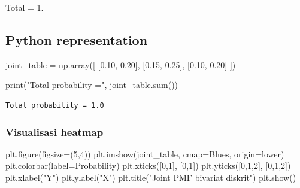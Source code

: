 \documentclass[
  letterpaper,
  DIV=11,
  numbers=noendperiod]{scrreprt}
\newenvironment{Shaded}{\begin{snugshade}}{\end{snugshade}}
\newcommand{\BuiltInTok}[1]{\textcolor[rgb]{0.00,0.23,0.31}{#1}}
\newcommand{\DecValTok}[1]{\textcolor[rgb]{0.68,0.00,0.00}{#1}}
\newcommand{\FloatTok}[1]{\textcolor[rgb]{0.68,0.00,0.00}{#1}}
\newcommand{\NormalTok}[1]{\textcolor[rgb]{0.00,0.23,0.31}{#1}}
\newcommand{\OperatorTok}[1]{\textcolor[rgb]{0.37,0.37,0.37}{#1}}
\newcommand{\StringTok}[1]{\textcolor[rgb]{0.13,0.47,0.30}{#1}}
\begin{document}
Total = 1.

\subsection{Python representation}\label{python-representation}

\begin{Shaded}
\begin{Highlighting}[]
\NormalTok{joint\_table }\OperatorTok{=}\NormalTok{ np.array([}
\NormalTok{    [}\FloatTok{0.10}\NormalTok{, }\FloatTok{0.20}\NormalTok{],}
\NormalTok{    [}\FloatTok{0.15}\NormalTok{, }\FloatTok{0.25}\NormalTok{],}
\NormalTok{    [}\FloatTok{0.10}\NormalTok{, }\FloatTok{0.20}\NormalTok{]}
\NormalTok{])}

\BuiltInTok{print}\NormalTok{(}\StringTok{"Total probability ="}\NormalTok{, joint\_table.}\BuiltInTok{sum}\NormalTok{())}
\end{Highlighting}
\end{Shaded}

\begin{verbatim}
Total probability = 1.0
\end{verbatim}

\subsubsection{Visualisasi heatmap}\label{visualisasi-heatmap}

\begin{Shaded}
\begin{Highlighting}[]
\NormalTok{plt.figure(figsize}\OperatorTok{=}\NormalTok{(}\DecValTok{5}\NormalTok{,}\DecValTok{4}\NormalTok{))}
\NormalTok{plt.imshow(joint\_table, cmap}\OperatorTok{=}\StringTok{\textquotesingle{}Blues\textquotesingle{}}\NormalTok{, origin}\OperatorTok{=}\StringTok{\textquotesingle{}lower\textquotesingle{}}\NormalTok{)}
\NormalTok{plt.colorbar(label}\OperatorTok{=}\StringTok{\textquotesingle{}Probability\textquotesingle{}}\NormalTok{)}
\NormalTok{plt.xticks([}\DecValTok{0}\NormalTok{,}\DecValTok{1}\NormalTok{], [}\DecValTok{0}\NormalTok{,}\DecValTok{1}\NormalTok{])}
\NormalTok{plt.yticks([}\DecValTok{0}\NormalTok{,}\DecValTok{1}\NormalTok{,}\DecValTok{2}\NormalTok{], [}\DecValTok{0}\NormalTok{,}\DecValTok{1}\NormalTok{,}\DecValTok{2}\NormalTok{])}
\NormalTok{plt.xlabel(}\StringTok{"Y"}\NormalTok{)}
\NormalTok{plt.ylabel(}\StringTok{"X"}\NormalTok{)}
\NormalTok{plt.title(}\StringTok{"Joint PMF bivariat diskrit"}\NormalTok{)}
\NormalTok{plt.show()}
\end{Highlighting}
\end{Shaded}
\end{document}
